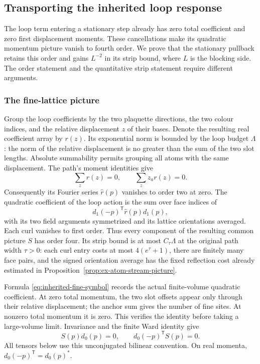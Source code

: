 \subsection{Transporting the inherited loop response}
\label{sec:inherited-loop-transport}
The loop term entering a stationary step already has zero total
coefficient and zero first displacement moments. These cancellations
make its quadratic momentum picture vanish to fourth order. We
prove that the stationary pullback retains this order and gains
$L^{-2}$ in its strip bound, where $L$ is the blocking side.
The order statement and the quantitative strip statement require
different arguments.

\subsubsection{The fine-lattice picture}
Group the loop coefficients by the two plaquette directions, the
two colour indices, and the relative displacement $z$ of their
bases. Denote the resulting real coefficient array by $r(z)$.
Its exponential norm is bounded by the loop budget $\Lambda$:
the norm of the relative displacement is no greater than the sum
of the two slot lengths. Absolute summability permits grouping
all atoms with the same displacement. The path's moment identities
give
\[
                         \sum_zr(z)=0,\qquad \sum_z z_a r(z)=0.
\]
Consequently its Fourier series $\widehat r(p)$ vanishes to order
two at zero. The quadratic coefficient of the loop action is the
sum over face indices of
\begin{equation}\label{eq:inherited-fine-symbol}
                  d_1(-p)^{\mathsf T}\widehat r(p)d_1(p),
\end{equation}
with its two field arguments symmetrized and its lattice
orientations averaged. Each curl vanishes to first order.
Thus every component of the resulting common picture $S$ has
order four. Its strip bound is at most $C_\tau\Lambda$ at the
original path width $\tau>0$: each curl entry costs at most
$4(e^\tau+1)$, there are finitely many face pairs, and the signed
orientation average has the fixed reflection cost already estimated
in Proposition~\ref{prop:ex-atom-stream-picture}.

Formula \eqref{eq:inherited-fine-symbol} records the actual
finite-volume quadratic coefficient. At zero total momentum, the
two slot offsets appear only through their relative displacement;
the anchor sum gives the number of fine sites. At nonzero total
momentum it is zero. This verifies the identity before taking a
large-volume limit. Invariance and the finite Ward identity give
\begin{equation}\label{eq:inherited-transverse}
                  S(p)d_0(p)=0,\qquad d_0(-p)^{\mathsf T}S(p)=0.
\end{equation}
All tensors below use this unconjugated bilinear convention. On
real momenta, $d_0(-p)^{\mathsf T}=d_0(p)^*$.

